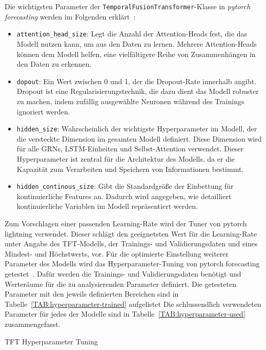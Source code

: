 Die wichtigsten Parameter der \lstinline[columns=fixed]{TemporalFusionTransformer}-Klasse in \textit{pytorch forecasting} werden im Folgenden erklärt~\cite{Joseph.2022}:
\begin{itemize}
  \item \lstinline[columns=fixed]{attention_head_size}: Legt die Anzahl der Attention-Heads fest, die das Modell  nutzen kann, um aus den Daten zu lernen.
 Mehrere Attention-Heads können dem Modell helfen, eine vielfältigere Reihe von Zusammenhängen in den Daten zu erkennen.
  \item \lstinline[columns=fixed]{dopout}: Ein Wert zwischen 0 und 1, der die Dropout-Rate innerhalb angibt.
  Dropout ist eine Regularisierungstechnik, die dazu dient das Modell robuster zu machen, indem zufällig ausgewählte Neuronen während des Trainings ignoriert werden.
  \item \lstinline[columns=fixed]{hidden_size}: Wahrscheinlich der wichtigste Hyperparameter im Modell, der die versteckte Dimension im gesamten Modell definiert.
 Diese Dimension wird für alle \acp{GRN}, \ac{LSTM}-Einheiten und Selbst-Attention verwendet.
 Dieser Hyperparameter ist zentral für die Architektur des Modells, da er die Kapazität zum Verarbeiten und Speichern von Informationen bestimmt.
 \item \lstinline[columns=fixed]{hidden_continous_size}: Gibt die Standardgröße der Einbettung für kontinuierliche Features an.
 Dadurch wird angegeben, wie detailliert kontinuierliche Variablen im Modell repräsentiert werden.
 \end{itemize}

Zum Vorschlagen einer passenden Learning-Rate wird der Tuner von pytorch lightning verwendet.
Dieser schlägt den geeignetsten Wert für die Learning-Rate unter Angabe des \ac{TFT}-Modells, der Trainings- und Validierungsdaten und eines Mindest- und Höchstwerts, vor.
Für die optimierte Einstellung weiterer Parameter des Modells wird das Hyperparameter-Tuning von pytorch forecasting getestet~\cite{PytorchForecastingDocumentation.20230410T20:05:46.000Z}.
Dafür werden die Trainings- und Validierungsdaten benötigt und Werteräume für die zu analysierenden Parameter definiert.
Die getesteten Parameter mit den jeweils definierten Bereichen sind in Tabelle~\ref{TAB:hyperparameter-trained} aufgelistet
Die schlussendlich verwendeten Parameter für jedes der Modelle sind in Tabelle~\ref{TAB:hyperparameter-used} zusammengefasst.
\begin{table}[t]
 \centering\small
 \caption{TFT Hyperparameter Tuning}
 \label{TAB:hyperparameter-trained}
 
\end{table}

